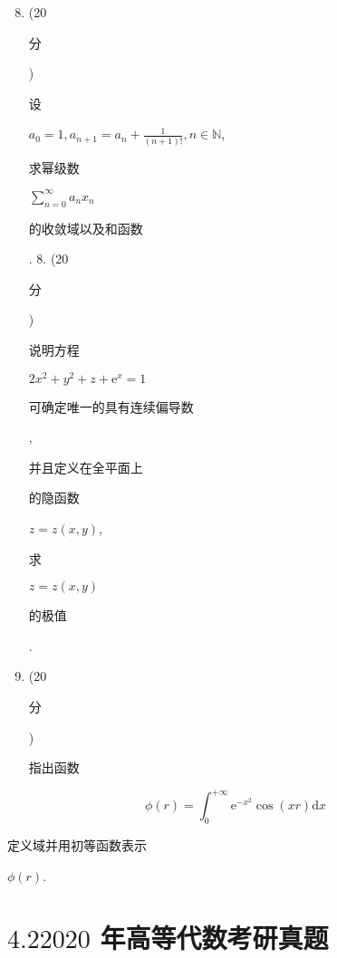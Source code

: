 \documentclass[10pt]{article}
\begin{document}
\begin{enumerate}
  \setcounter{enumi}{7}
  \item (20 \begin{CJK}{UTF8}{mj}分\end{CJK}) \begin{CJK}{UTF8}{mj}设\end{CJK} $a_{0}=1, a_{n+1}=a_{n}+\frac{1}{(n+1) !}, n \in \mathbb{N}$, \begin{CJK}{UTF8}{mj}求幂级数\end{CJK} $\sum_{n=0}^{\infty} a_{n} x_{n}$ \begin{CJK}{UTF8}{mj}的收敛域以及和函数\end{CJK}. 8. (20 \begin{CJK}{UTF8}{mj}分\end{CJK}) \begin{CJK}{UTF8}{mj}说明方程\end{CJK} $2 x^{2}+y^{2}+z+\mathrm{e}^{x}=1$ \begin{CJK}{UTF8}{mj}可确定唯一的具有连续偏导数\end{CJK}, \begin{CJK}{UTF8}{mj}并且定义在全平面上\end{CJK} \begin{CJK}{UTF8}{mj}的隐函数\end{CJK} $z=z(x, y)$, \begin{CJK}{UTF8}{mj}求\end{CJK} $z=z(x, y)$ \begin{CJK}{UTF8}{mj}的极值\end{CJK}.

  \item (20 \begin{CJK}{UTF8}{mj}分\end{CJK}) \begin{CJK}{UTF8}{mj}指出函数\end{CJK}

\end{enumerate}
$$
\phi(r)=\int_{0}^{+\infty} \mathrm{e}^{-x^{2}} \cos (x r) \mathrm{d} x
$$
\begin{CJK}{UTF8}{mj}定义域并用初等函数表示\end{CJK} $\phi(r)$.

\section{$4.22020$ 年高等代数考研真题}
\end{document}
